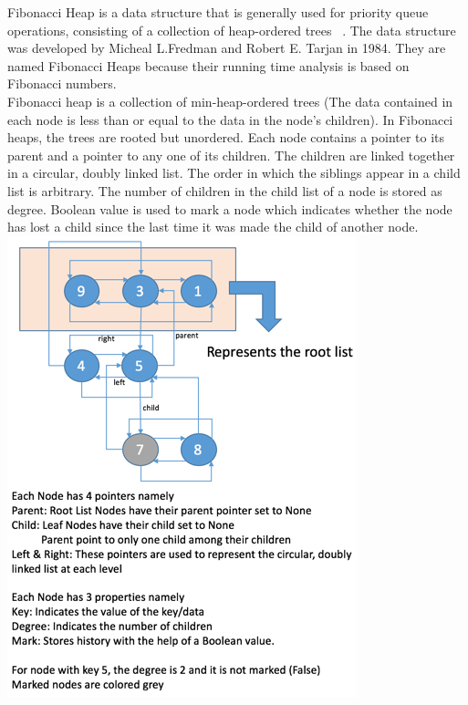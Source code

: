 Fibonacci Heap is a data structure that is generally used for priority queue operations, consisting of a collection of heap-ordered trees~\cite{wikiFiboHeap,cormen2009introduction} . The data structure was developed by Micheal L.Fredman and Robert E. Tarjan in 1984. They are named Fibonacci Heaps because their running time analysis is based on Fibonacci numbers. \\

Fibonacci heap is a collection of min-heap-ordered trees (The data contained in each node is less than or equal to the data  in the node's children). In Fibonacci heaps, the trees are rooted but unordered. Each node contains a pointer to its parent and a pointer to any one of its children. The children are linked together in a circular, doubly linked list. The order in which the siblings appear in a child list is arbitrary. The number of children in the child list of a node is stored as degree. Boolean value is used to mark a node which indicates whether  the node has lost a child since the last time it was made the child of another node.\\

\includegraphics[scale=0.5]{Figures/FibonacciHeap}
